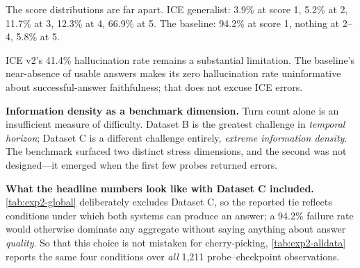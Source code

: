 \documentclass[twoside,11pt]{article}
\begin{document}
\begin{table}[tbp]
\centering
\small


\caption{ICE v2 density stress test on Dataset C (154 probe--checkpoint observations). The vector baseline collapses because it has no token-budget cap. ICE survives with a mean score of 4.33 and 77\% fewer tokens injected. The baseline's 0\% hallucination rate is an artefact: 94.2\% of its responses are complete failures, so there is no answer to evaluate.}
\label{tab:stress}
\end{table}

The score distributions are far apart. ICE generalist: 3.9\% at score 1, 5.2\% at 2, 11.7\% at 3, 12.3\% at 4, 66.9\% at 5. The baseline: 94.2\% at score 1, nothing at 2--4, 5.8\% at 5.

ICE v2's 41.4\% hallucination rate remains a substantial limitation. The baseline's near-absence of usable answers makes its zero hallucination rate uninformative about successful-answer faithfulness; that does not excuse ICE errors.

\textbf{Information density as a benchmark dimension.} Turn count alone is an insufficient measure of difficulty. Dataset B is the greatest challenge in \emph{temporal horizon}; Dataset C is a different challenge entirely, \emph{extreme information density}. The benchmark surfaced two distinct stress dimensions, and the second was not designed---it emerged when the first few probes returned errors.

\textbf{What the headline numbers look like with Dataset C included.} \cref{tab:exp2-global} deliberately excludes Dataset C, so the reported tie reflects conditions under which both systems can produce an answer; a 94.2\% failure rate would otherwise dominate any aggregate without saying anything about answer \emph{quality}. So that this choice is not mistaken for cherry-picking, \cref{tab:exp2-alldata} reports the same four conditions over \emph{all} 1{,}211 probe--checkpoint observations.
\end{document}

